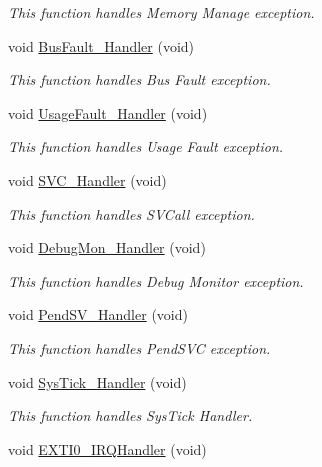 \begin{DoxyCompactItemize}
\begin{DoxyCompactList}\small\item\em This function handles Memory Manage exception. \end{DoxyCompactList}\item 
void \hyperlink{group___i_w_d_g___example_ga850cefb17a977292ae5eb4cafa9976c3}{Bus\-Fault\-\_\-\-Handler} (void)
\begin{DoxyCompactList}\small\item\em This function handles Bus Fault exception. \end{DoxyCompactList}\item 
void \hyperlink{group___i_w_d_g___example_ga1d98923de2ed6b7309b66f9ba2971647}{Usage\-Fault\-\_\-\-Handler} (void)
\begin{DoxyCompactList}\small\item\em This function handles Usage Fault exception. \end{DoxyCompactList}\item 
void \hyperlink{group___i_w_d_g___example_ga3e5ddb3df0d62f2dc357e64a3f04a6ce}{S\-V\-C\-\_\-\-Handler} (void)
\begin{DoxyCompactList}\small\item\em This function handles S\-V\-Call exception. \end{DoxyCompactList}\item 
void \hyperlink{group___i_w_d_g___example_gadbdfb05858cc36fc520974df37ec3cb0}{Debug\-Mon\-\_\-\-Handler} (void)
\begin{DoxyCompactList}\small\item\em This function handles Debug Monitor exception. \end{DoxyCompactList}\item 
void \hyperlink{group___i_w_d_g___example_ga6303e1f258cbdc1f970ce579cc015623}{Pend\-S\-V\-\_\-\-Handler} (void)
\begin{DoxyCompactList}\small\item\em This function handles Pend\-S\-V\-C exception. \end{DoxyCompactList}\item 
void \hyperlink{group___i_w_d_g___example_gab5e09814056d617c521549e542639b7e}{Sys\-Tick\-\_\-\-Handler} (void)
\begin{DoxyCompactList}\small\item\em This function handles Sys\-Tick Handler. \end{DoxyCompactList}\item 
void \hyperlink{group___i_w_d_g___example_ga17e9789a29a87d2df54f12b94dd1a0b6}{E\-X\-T\-I0\-\_\-\-I\-R\-Q\-Handler} (void)

\end{DoxyCompactItemize}
